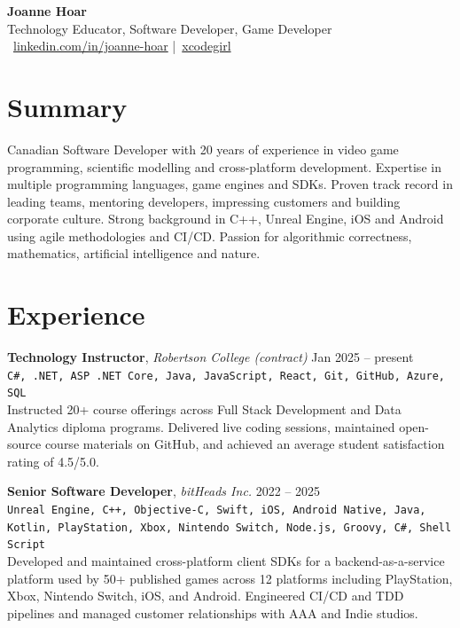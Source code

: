 \documentclass[10pt]{article}
\begin{document}
\pagestyle{empty}

\begin{center}
{\LARGE\bfseries Joanne Hoar}\\[4pt]
{\large Technology Educator, Software Developer, Game Developer}\\[4pt]
~\href{https://linkedin.com/in/joanne-hoar/}{linkedin.com/in/joanne-hoar} \enspace|\enspace {}~\href{https://github.com/xcodegirl}{xcodegirl}\\
\end{center}
\vspace{4pt}

\section*{Summary}
Canadian Software Developer with 20 years of experience in video game programming, scientific modelling and cross-platform development. Expertise in multiple programming languages, game engines and SDKs. Proven track record in leading teams, mentoring developers, impressing customers and building corporate culture. Strong background in C++, Unreal Engine, iOS and Android using agile methodologies and CI/CD. Passion for algorithmic correctness, mathematics, artificial intelligence and nature.

\section*{Experience}
\textbf{Technology Instructor}, \textit{Robertson College (contract)} \hfill Jan 2025 -- present
\\\texttt{\small C\#, .NET, ASP .NET Core, Java, JavaScript, React, Git, GitHub, Azure, SQL}
\\[-2pt]
Instructed 20+ course offerings across Full Stack Development and Data Analytics diploma programs. Delivered live coding sessions, maintained open-source course materials on GitHub, and achieved an average student satisfaction rating of 4.5/5.0.


\textbf{Senior Software Developer}, \textit{bitHeads Inc.} \hfill 2022 -- 2025
\\\texttt{\small Unreal Engine, C++, Objective-C, Swift, iOS, Android Native, Java, Kotlin, PlayStation, Xbox, Nintendo Switch, Node.js, Groovy, C\#, Shell Script}
\\[-2pt]
Developed and maintained cross-platform client SDKs for a backend-as-a-service platform used by 50+ published games across 12 platforms including PlayStation, Xbox, Nintendo Switch, iOS, and Android. Engineered CI/CD and TDD pipelines and managed customer relationships with AAA and Indie studios.
\end{document}
